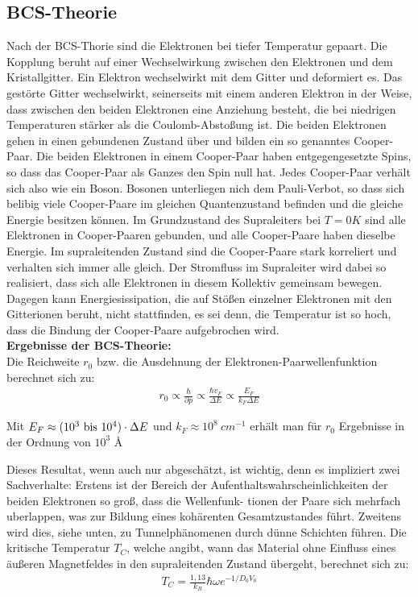 \documentclass[12pt]{article}
\begin{document}
\subsection{BCS-Theorie}
\label{bcs}
Nach der BCS-Thorie sind die Elektronen bei tiefer Temperatur gepaart. Die Kopplung beruht auf einer Wechselwirkung zwischen den Elektronen und dem Kristallgitter. Ein Elektron wechselwirkt mit dem Gitter und deformiert es. Das gestörte Gitter wechselwirkt, seinerseits mit einem anderen Elektron in der Weise, dass zwischen den beiden Elektronen eine Anziehung besteht, die bei niedrigen Temperaturen stärker als die Coulomb-Abstoßung ist. Die beiden Elektronen gehen in einen gebundenen Zustand über und bilden ein so genanntes Cooper-Paar. Die beiden Elektronen in einem Cooper-Paar haben entgegengesetzte Spins, so dass das Cooper-Paar als Ganzes den Spin null hat. Jedes Cooper-Paar verhält sich also wie ein Boson. Bosonen unterliegen nich dem Pauli-Verbot, so dass sich belibig viele Cooper-Paare im gleichen Quantenzustand befinden und die gleiche Energie besitzen können. Im Grundzustand des Supraleiters bei $T = 0K$ sind alle Elektronen in Cooper-Paaren gebunden, und alle Cooper-Paare haben dieselbe Energie. Im supraleitenden Zustand sind die Cooper-Paare stark korreliert und verhalten sich immer alle gleich. Der Stromfluss im Supraleiter wird dabei so realisiert, dass sich alle Elektronen in diesem Kollektiv gemeinsam bewegen. Dagegen kann Energiesissipation, die auf Stößen einzelner Elektronen mit den Gitterionen beruht, nicht stattfinden, es sei denn, die Temperatur ist so hoch, dass die Bindung der Cooper-Paare aufgebrochen wird. \\

\textbf{Ergebnisse der BCS-Theorie:} \\

Die Reichweite $r_0$ bzw. die Ausdehnung der Elektronen-Paarwellenfunktion berechnet sich zu:
\begin{align}
r_0 \propto \frac{\hbar}{\partial p} \propto \frac{\hbar v_F}{\Delta E} \propto \frac{E_F}{k_F \Delta E}
\end{align}

Mit $E_F \approx (10^3 ~\textnormal{bis}~ 10^4) \cdot \Delta E$ und $k_F \approx 10^8~ cm^{-1}$ erhält man für $r_0$ Ergebnisse in der Ordnung von $10^3$ \AA

Dieses Resultat, wenn auch nur abgeschätzt, ist wichtig, denn es impliziert zwei Sachverhalte: Erstens
ist der Bereich der Aufenthaltswahrscheinlichkeiten der beiden Elektronen so groß, dass die Wellenfunk-
tionen der Paare sich mehrfach uberlappen, was zur Bildung eines kohärenten Gesamtzustandes führt.
Zweitens wird dies, siehe unten, zu Tunnelphänomenen durch dünne Schichten führen.
Die kritische Temperatur $T_C$, welche angibt, wann das Material ohne Einfluss eines äußeren Magnetfeldes 
in den supraleitenden Zustand übergeht, berechnet sich zu:
\begin{align}
 T_C = \frac{1,13}{k_B} \hbar \omega e^{-1/D_0 V_0}
\end{align}
\end{document}
